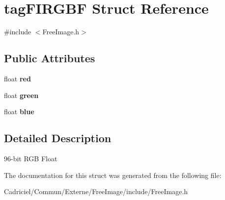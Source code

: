 \hypertarget{structtag_f_i_r_g_b_f}{}\section{tag\+F\+I\+R\+G\+BF Struct Reference}
\label{structtag_f_i_r_g_b_f}


{\ttfamily \#include $<$Free\+Image.\+h$>$}

\subsection*{Public Attributes}
\begin{DoxyCompactItemize}
\item 
float {\bfseries red}\hypertarget{structtag_f_i_r_g_b_f_ab15fa4a5afe84d7d66e598a1c1a17ffa}{}\label{structtag_f_i_r_g_b_f_ab15fa4a5afe84d7d66e598a1c1a17ffa}

\item 
float {\bfseries green}\hypertarget{structtag_f_i_r_g_b_f_ac062604601e6b4da84deb02a29287774}{}\label{structtag_f_i_r_g_b_f_ac062604601e6b4da84deb02a29287774}

\item 
float {\bfseries blue}\hypertarget{structtag_f_i_r_g_b_f_a18cf7966f5a4f5ffd0820aa5a18f8362}{}\label{structtag_f_i_r_g_b_f_a18cf7966f5a4f5ffd0820aa5a18f8362}

\end{DoxyCompactItemize}


\subsection{Detailed Description}
96-\/bit R\+GB Float 

The documentation for this struct was generated from the following file\+:\begin{DoxyCompactItemize}
\item 
Cadriciel/\+Commun/\+Externe/\+Free\+Image/include/Free\+Image.\+h\end{DoxyCompactItemize}
